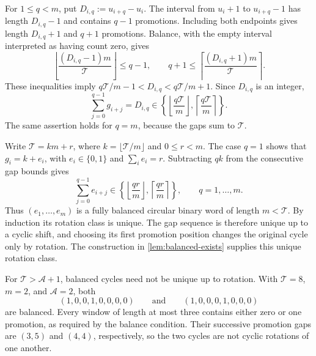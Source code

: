For \(1\le q<m\), put \(D_{i,q}:=u_{i+q}-u_i\). The interval from \(u_i+1\) to \(u_{i+q}-1\) has length \(D_{i,q}-1\) and contains \(q-1\) promotions. Including both endpoints gives length \(D_{i,q}+1\) and \(q+1\) promotions. Balance, with the empty interval interpreted as having count zero, gives
\[
    \left\lfloor\frac{(D_{i,q}-1)m}{\mathcal T}\right\rfloor\le q-1,
    \qquad
    q+1\le\left\lceil\frac{(D_{i,q}+1)m}{\mathcal T}\right\rceil.
\]
These inequalities imply \(q\mathcal T/m-1<D_{i,q}<q\mathcal T/m+1\). Since \(D_{i,q}\) is an integer,
\[
    \sum_{j=0}^{q-1}g_{i+j}=D_{i,q}
    \in\left\{\left\lfloor\frac{q\mathcal T}{m}\right\rfloor,
                    \left\lceil\frac{q\mathcal T}{m}\right\rceil\right\}.
\]
The same assertion holds for \(q=m\), because the gaps sum to \(\mathcal T\).

Write \(\mathcal T=km+r\), where \(k=\lfloor \mathcal T/m\rfloor\) and \(0\le r<m\). The case \(q=1\) shows that \(g_i=k+e_i\), with \(e_i\in\{0,1\}\) and \(\sum_i e_i=r\). Subtracting \(qk\) from the consecutive gap bounds gives
\[
    \sum_{j=0}^{q-1}e_{i+j}
    \in\left\{\left\lfloor\frac{qr}{m}\right\rfloor,
                    \left\lceil\frac{qr}{m}\right\rceil\right\},
    \qquad q=1,\ldots,m.
\]
Thus \((e_1,\ldots,e_m)\) is a fully balanced circular binary word of length \(m<\mathcal T\). By induction its rotation class is unique. The gap sequence is therefore unique up to a cyclic shift, and choosing its first promotion position changes the original cycle only by rotation. The construction in \autoref{lem:balanced-exists} supplies this unique rotation class.

For \(\mathcal T>\mathcal A+1\), balanced cycles need not be unique up to rotation. With \(\mathcal T=8\), \(m=2\), and \(\mathcal A=2\), both
\[
    (1,0,0,1,0,0,0,0)
    \qquad\text{and}\qquad
    (1,0,0,0,1,0,0,0)
\]
are balanced. Every window of length at most three contains either zero or one promotion, as required by the balance condition. Their successive promotion gaps are \((3,5)\) and \((4,4)\), respectively, so the two cycles are not cyclic rotations of one another.

